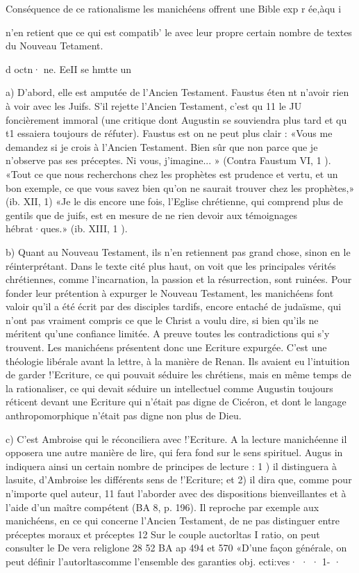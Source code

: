 Conséquence de ce rationalisme les manichéens offrent une Bible exp r ée,àqu i
 
n'en retient que ce qui est compatib' le avec leur propre certain nombre de textes du Nouveau Tetament.
 
d octn· ne. EeII se hmtte	un
 

a)	D'abord, elle est amputée de l'Ancien Testament. Faustus éten nt n'avoir rien à voir avec les Juifs. S'il rejette l'Ancien Testament, c'est qu 11 le JU foncièrement immoral (une critique dont Augustin se souviendra plus tard et qu t1
essaiera toujours de réfuter). Faustus est on ne peut plus clair  : «Vous me demandez si je crois à l'Ancien Testament. Bien sûr que non parce que je n'observe pas ses préceptes. Ni vous, j'imagine... » (Contra Faustum VI, 1 ). «Tout ce que nous recherchons chez les prophètes est prudence et vertu, et un bon exemple, ce que vous savez bien qu'on ne saurait trouver chez les prophètes,» (ib. XII, 1) «Je le dis encore une fois, l'Eglise chrétienne, qui comprend plus de gentils que de juifs, est en mesure de ne rien devoir aux témoignages hébrat·ques.» (ib. XIII, 1 ).

b)	Quant au Nouveau Testament, ils n'en retiennent pas grand chose, sinon en le réinterprétant. Dans le texte cité plus haut, on voit que les principales vérités chrétiennes, comme l'incarnation, la passion et la résurrection, sont ruinées.	Pour fonder leur prétention à expurger le Nouveau Testament, les manichéens font valoir qu'il a été écrit par des disciples tardifs, encore entaché de judaïsme, qui n'ont pas vraiment compris ce que le Christ a voulu dire, si bien qu'ils ne méritent qu'une confiance limitée. A preuve toutes les contradictions qui s'y trouvent. Les manichéens présentent donc une Ecriture expurgée. C'est une théologie libérale avant la lettre, à la manière de Renan. Ils avaient eu l'intuition de garder !'Ecriture, ce qui pouvait séduire les chrétiens, mais en même temps de la rationaliser, ce qui devait séduire un intellectuel comme Augustin toujours réticent devant une Ecriture qui n'était pas digne de Cicéron, et dont le langage anthropomorphique n'était pas digne non plus de Dieu.

c)	C'est Ambroise qui le réconciliera avec !'Ecriture. A la lecture manichéenne il opposera une autre manière de lire, qui fera fond sur le	sens	spirituel. Augus in indiquera ainsi un certain nombre de principes de lecture : 1 ) il distinguera à lasuite, d'Ambroise les différents sens de !'Ecriture; et 2) il dira que, comme pour n'importe quel auteur,	11 faut l'aborder avec des dispositions bienveillantes et à l'aide d'un maître compétent (BA 8, p. 196). Il reproche par exemple aux manichéens, en ce qui concerne l'Ancien Testament, de ne pas distinguer entre préceptes moraux et préceptes
12 Sur le couple auctorltas I ratio, on peut consulter le De vera religlone 28 52 BA ap	494 et 570
«D'une façon générale, on peut définir l'autorltascomme l'ensemble des garanties obj.	ecti:ves·	· · 1- ·
 

